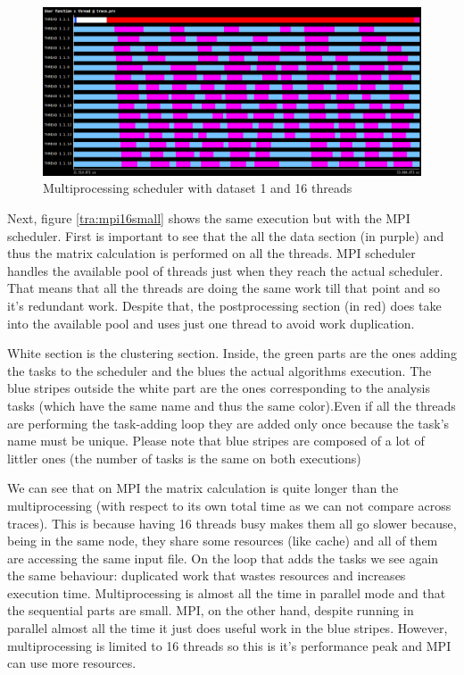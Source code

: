 \begin{figure}[h]
\includegraphics[width=\textwidth]{traces/par_16_small.png}
\caption{Multiprocessing scheduler with dataset 1 and 16 threads}
\label{tra:par16small}
\end{figure}

Next, figure \ref{tra:mpi16small} shows the same execution but with the MPI scheduler. First is important to see that the all the data section (in purple) and thus the matrix calculation is performed on all the threads. MPI scheduler handles the available pool of threads just when they reach the actual scheduler. That means that all the threads are doing the same work till that point and so it's redundant work. Despite that, the postprocessing section (in red) does take into the available pool and uses just one thread to avoid work duplication. 

White section is the clustering section. Inside, the green parts are the ones adding the tasks to the scheduler and the blues the actual algorithms execution. The blue stripes outside the white part are the ones corresponding to the analysis tasks (which have the same name and thus the same color).Even if all the threads are performing the task-adding loop they are added only once because the task's name must be unique. Please note that blue stripes are composed of a lot of littler ones (the number of tasks is the same on both executions)  

We can see that on MPI the matrix calculation is quite longer than the multiprocessing (with respect to its own total time as we can not compare across traces). This is because having 16 threads busy makes them all go slower because, being in the same node, they share some resources (like cache) and all of them are accessing the same input file. On the loop that adds the tasks we see again the same behaviour: duplicated work that wastes resources and increases execution time. Multiprocessing is almost all the time in parallel mode and that the sequential parts are small. MPI, on the other hand, despite running in parallel almost all the time it just does useful work in the blue stripes. However, multiprocessing is limited to 16 threads so this is it's performance peak and MPI can use more resources.

